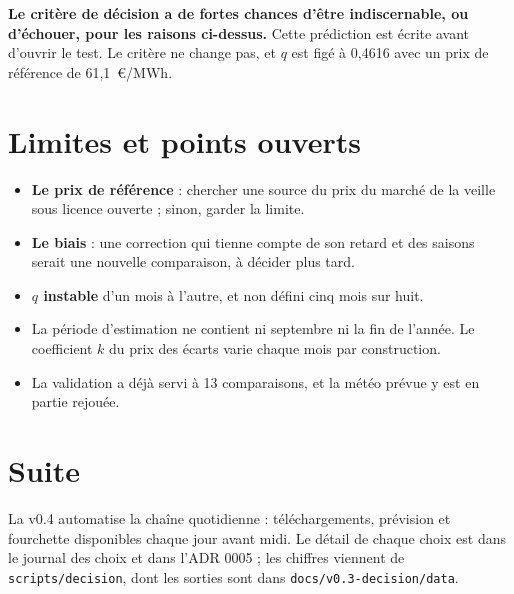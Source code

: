 \documentclass[11pt,a4paper]{article}
\begin{document}
\textbf{Le critère de décision a de fortes chances d'être indiscernable, ou d'échouer, pour les raisons ci-dessus.} Cette prédiction est écrite avant d'ouvrir le test. Le critère ne change pas, et $q$ est figé à 0,4616 avec un prix de référence de 61,1~€/MWh.

\section{Limites et points ouverts}

\begin{itemize}
  \item \textbf{Le prix de référence} : chercher une source du prix du marché de la veille sous licence ouverte ; sinon, garder la limite.
  \item \textbf{Le biais} : une correction qui tienne compte de son retard et des saisons serait une nouvelle comparaison, à décider plus tard.
  \item \textbf{$q$ instable} d'un mois à l'autre, et non défini cinq mois sur huit.
  \item La période d'estimation ne contient ni septembre ni la fin de l'année. Le coefficient $k$ du prix des écarts varie chaque mois par construction.
  \item La validation a déjà servi à 13 comparaisons, et la météo prévue y est en partie rejouée.
\end{itemize}

\section{Suite}

La v0.4 automatise la chaîne quotidienne : téléchargements, prévision et fourchette disponibles chaque jour avant midi. Le détail de chaque choix est dans le journal des choix et dans l'ADR 0005 ; les chiffres viennent de \nolinkurl{scripts/decision}, dont les sorties sont dans \nolinkurl{docs/v0.3-decision/data}.
\end{document}
